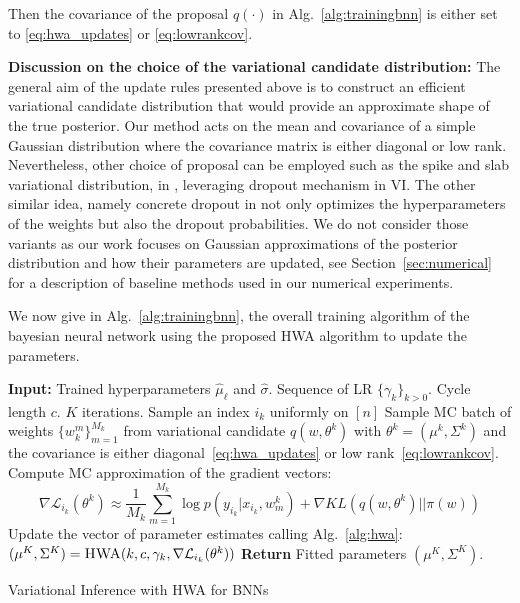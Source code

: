 \documentclass[tablecaption=bottom,wcp]{jmlr}
\begin{document}
Then the covariance of the proposal $q(\cdot)$ in Alg.~\ref{alg:trainingbnn} is either set to \eqref{eq:hwa_updates} or \eqref{eq:lowrankcov}.

\textbf{Discussion on the choice of the variational candidate distribution:} 
The general aim of the update rules presented above is to construct an efficient variational candidate distribution that would provide an approximate shape of the true posterior. Our method acts on the mean and covariance of a simple Gaussian distribution where the covariance matrix is either diagonal or low rank.
Nevertheless, other choice of proposal can be employed such as the spike and slab variational distribution, in \citep{gal2016dropout}, leveraging dropout mechanism in VI. 
The other similar idea, namely concrete dropout in \citep{gal2017concrete} not only optimizes the hyperparameters of the weights but also the dropout probabilities.
We do not consider those variants as our work focuses on Gaussian approximations of the posterior distribution and how their parameters are updated, see Section~\ref{sec:numerical} for a description of baseline methods used in our numerical experiments.


We now give in Alg.~\ref{alg:trainingbnn}, the overall training algorithm of the bayesian neural network using the proposed HWA algorithm to update the parameters.
\begin{algorithm}[H]
\begin{algorithmic}[1]
\STATE \textbf{Input:} Trained hyperparameters $\hat{\mu}_{\ell}$ and $\hat{\sigma}$. Sequence of LR $\{\gamma_k\}_{k > 0}$. Cycle length $c$. $K$ iterations.
\STATE Sample an index $i_k$ uniformly on $[n]$
\STATE Sample MC batch of weights $\{w^m_k\}_{m=1}^{M_k}$  from variational candidate $q(w, \theta^k)$ with $\theta^k = (\mu^k, \Sigma^k)$ and the covariance is either diagonal~\eqref{eq:hwa_updates} or low rank~\eqref{eq:lowrankcov}.
\STATE Compute MC approximation of the gradient vectors:
$$ \nabla \mathcal{L}_{i_{k}}(\theta^{k}) \approx \frac{1}{M_k} \sum_{m=1}^{M_k} \log p(y_{i_k} | x_{i_k}, w^k_m)  + \nabla KL(q(w, \theta^k)||\pi(w)) $$
\STATE Update the vector of parameter estimates calling Alg.~\ref{alg:hwa}: $(\mu^K, \Sigma^K) =  \textsc{HWA}(k, c, \gamma_k, \nabla \mathcal{L}_{i_{k}}(\theta^{k}) )$
\ENDFOR
\STATE \textbf{Return} Fitted parameters $(\mu^K, \Sigma^K)$.
\end{algorithmic}
\caption{Variational Inference with HWA for BNNs}
\label{alg:trainingbnn}
\end{algorithm}
\end{document}
